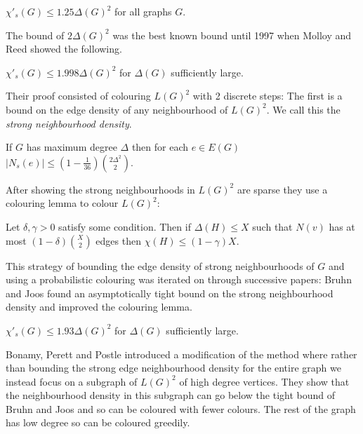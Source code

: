 \begin{conjecture}
    $\chi'_s(G) \leq 1.25\Delta(G)^2$ for all graphs $G$.
\end{conjecture}

The bound of $2\Delta(G)^2$ was the best known bound until 1997 when Molloy and Reed
showed the following.
\begin{knowntheorem}
    $\chi'_s(G) \leq 1.998\Delta(G)^2$ for $\Delta(G)$ sufficiently large.
\end{knowntheorem}

Their proof consisted of colouring $L(G)^2$ with 2 discrete steps:
The first is a bound on the edge density of any neighbourhood of $L(G)^2$. We call
this the \textit{strong neighbourhood density}.
\begin{knownlemma}
    If $G$ has maximum degree $\Delta$ then for each $e\in E(G)$
    $|N_s(e)| \leq (1-\frac{1}{36})\binom{2\Delta^2}{2}$.
\end{knownlemma}
After showing the strong neighbourhoods in $L(G)^2$ are sparse they use a colouring
lemma to colour $L(G)^2$:
\begin{knownlemma}
    Let $\delta, \gamma > 0$ satisfy some condition. Then if
    $\Delta(H) \leq X$ such that $N(v)$ has at most $(1-\delta)\binom{X}{2}$ edges
    then $\chi(H)\leq (1-\gamma)X$.
\end{knownlemma}

This strategy of bounding the edge density of strong neighbourhoods of $G$ and
using a probabilistic colouring was iterated on through successive papers:
Bruhn and Joos found an asymptotically tight bound on the strong neighbourhood density
and improved the colouring lemma.
\begin{knowntheorem}
    $\chi'_s(G) \leq 1.93\Delta(G)^2$ for $\Delta(G)$ sufficiently large.
\end{knowntheorem}
Bonamy, Perett and Postle introduced a modification of the method where rather than
bounding the strong edge neighbourhood density for the entire graph we instead focus
on a subgraph of $L(G)^2$ of high degree vertices. They show that the
neighbourhood density in this subgraph can go below the tight bound of Bruhn and Joos
and so can be coloured with fewer colours. The rest of the graph has low degree so can
be coloured greedily.

